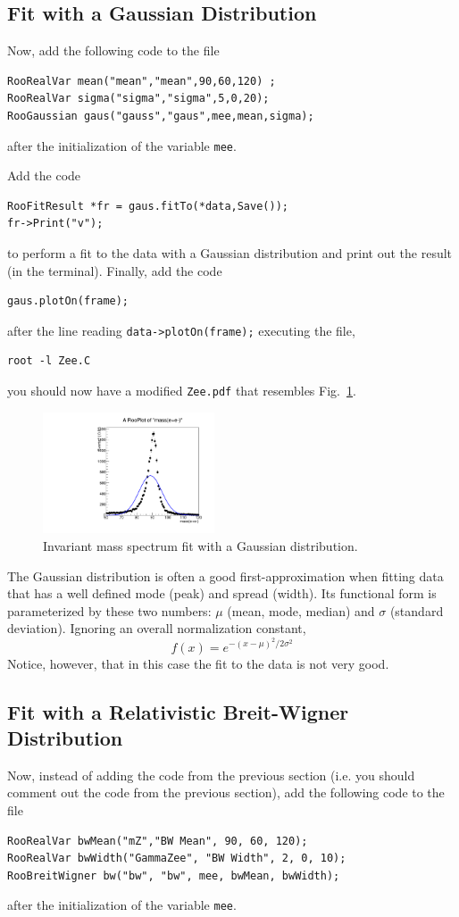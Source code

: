 \documentclass{article}
\begin{document}
\subsection{Fit with a Gaussian Distribution}

Now, add the following code to the file
\begin{verbatim}
RooRealVar mean("mean","mean",90,60,120) ;
RooRealVar sigma("sigma","sigma",5,0,20);
RooGaussian gaus("gauss","gaus",mee,mean,sigma);  
\end{verbatim}
after the initialization of the variable \texttt{mee}.

Add the code 
\begin{verbatim}
RooFitResult *fr = gaus.fitTo(*data,Save());
fr->Print("v");  
\end{verbatim}
to perform a fit to the data with a Gaussian distribution and print out the result (in the terminal). Finally, add the code
\begin{verbatim}
gaus.plotOn(frame);
\end{verbatim}
after the line reading \texttt{data->plotOn(frame);} executing the file, 
\begin{verbatim}
root -l Zee.C
\end{verbatim} 
you should now have a modified \texttt{Zee.pdf} that resembles Fig.~\ref{fig:Zee_gaus}.
\begin{figure}
    \centering
    \includegraphics[width=2.0in]{Zee_gauss.pdf}
    \caption{Invariant mass spectrum fit with a Gaussian distribution.}
    \label{fig:Zee_gaus}
\end{figure} 
The Gaussian distribution is often a good first-approximation when fitting
data that has a well defined mode (peak) and spread (width). Its
functional form is parameterized by these two numbers: $\mu$ (mean,
mode, median) and $\sigma$ (standard deviation). Ignoring an overall
normalization constant, 
\begin{equation}
f(x) = e^{-(x-\mu)^2/2\sigma^2}
\end{equation}
Notice, however, that in this case the fit to the data is not very good.

\subsection{Fit with a Relativistic Breit-Wigner Distribution}
Now, instead of adding the code from the previous section (i.e. you should comment out the code from the previous section), add the following code to the file
\begin{verbatim}
RooRealVar bwMean("mZ","BW Mean", 90, 60, 120);
RooRealVar bwWidth("GammaZee", "BW Width", 2, 0, 10);
RooBreitWigner bw("bw", "bw", mee, bwMean, bwWidth);  
\end{verbatim}
after the initialization of the variable \texttt{mee}. 
\end{document}
